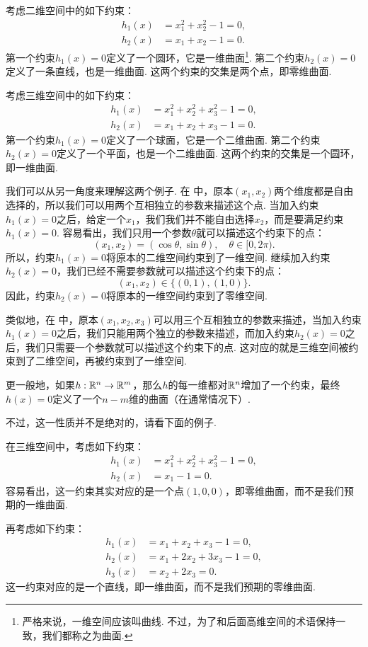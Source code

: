 \begin{example}[二维空间中的约束]\label{ex:2d-constraint}
考虑二维空间中的如下约束：
\begin{align*}
    h_1(x)&=x_1^2+x_2^2-1=0,\\
    h_2(x)&=x_1+x_2-1=0.
\end{align*}
第一个约束$h_1(x)=0$定义了一个圆环，它是一维曲面\footnote{严格来说，一维空间应该叫曲线. 不过，为了和后面高维空间的术语保持一致，我们都称之为曲面. }. 第二个约束$h_2(x)=0$定义了一条直线，也是一维曲面. 这两个约束的交集是两个点，即零维曲面.
\end{example}

\begin{example}[三维空间中的约束]\label{ex:3d-constraint}
考虑三维空间中的如下约束：
\begin{align*}
    h_1(x)&=x_1^2+x_2^2+x_3^2-1=0,\\
    h_2(x)&=x_1+x_2+x_3-1=0.
\end{align*}
第一个约束$h_1(x)=0$定义了一个球面，它是一个二维曲面. 第二个约束$h_2(x)=0$定义了一个平面，也是一个二维曲面. 这两个约束的交集是一个圆环，即一维曲面.
\end{example}

我们可以从另一角度来理解这两个例子. 在 中，原本$(x_1,x_2)$两个维度都是自由选择的，所以我们可以用两个互相独立的参数来描述这个点. 当加入约束$h_1(x)=0$之后，给定一个$x_1$，我们我们并不能自由选择$x_2$，而是要满足约束$h_1(x)=0$. 容易看出，我们只用一个参数$\theta$就可以描述这个约束下的点：
\[
(x_1,x_2)=(\cos\theta,\sin\theta),\quad \theta\in[0,2\pi).
\]
所以，约束$h_1(x)=0$将原本的二维空间约束到了一维空间. 继续加入约束$h_2(x)=0$，我们已经不需要参数就可以描述这个约束下的点：
\[
(x_1,x_2)\in\{(0,1),(1,0)\}.
\]
因此，约束$h_2(x)=0$将原本的一维空间约束到了零维空间.

类似地，在 中，原本$(x_1,x_2,x_3)$可以用三个互相独立的参数来描述，当加入约束$h_1(x)=0$之后，我们只能用两个独立的参数来描述，而加入约束$h_2(x)=0$之后，我们只需要一个参数就可以描述这个约束下的点. 这对应的就是三维空间被约束到了二维空间，再被约束到了一维空间.

更一般地，如果$h:\mathbb{R}^n\to\mathbb{R}^m$，那么$h$的每一维都对$\mathbb{R}^n$增加了一个约束，最终$h(x)=0$定义了一个$n-m$维的曲面（在通常情况下）. 

不过，这一性质并不是绝对的，请看下面的例子. 

\begin{example}\label{ex:3d-constraint-2}
在三维空间中，考虑如下约束：
\begin{align*}
    h_1(x)&=x_1^2+x_2^2+x_3^2-1=0,\\
    h_2(x)&=x_1-1=0.
\end{align*}
容易看出，这一约束其实对应的是一个点$(1,0,0)$，即零维曲面，而不是我们预期的一维曲面.

再考虑如下约束：
\begin{align*}
    h_1(x)&=x_1+x_2+x_3-1=0,\\
    h_2(x)&=x_1+2x_2+3x_3-1=0,\\
    h_3(x)&=x_2+2x_3=0.
\end{align*}
这一约束对应的是一个直线，即一维曲面，而不是我们预期的零维曲面.
\end{example}

